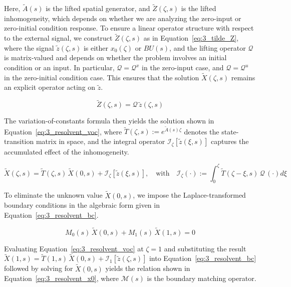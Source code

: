 Here, $\tilde{A}(s)$ is the lifted spatial generator, and $\tilde{Z}(\zeta, s)$ is the lifted inhomogeneity, which depends on whether we are analyzing the zero-input or zero-initial condition response. To ensure a linear operator structure with respect to the external signal, we construct $\tilde{Z}(\zeta, s)$ as in Equation~\eqref{eq:3_tilde_Z}, where the signal $\tilde{z}(\zeta, s)$ is either $x_0(\zeta)$ or $B U(s)$, and the lifting operator $\mathcal{Q}$ is matrix-valued and depends on whether the problem involves an initial condition or an input. In particular, $\mathcal{Q} = \mathcal{Q}^x$ in the zero-input case, and $\mathcal{Q} = \mathcal{Q}^u$ in the zero-initial condition case. This ensures that the solution $\tilde{X}(\zeta, s)$ remains an explicit operator acting on $\tilde{z}$.

\begin{equation} \label{eq:3_tilde_Z}
\tilde{Z}(\zeta, s) = \mathcal{Q}\, \tilde{z}(\zeta, s)
\end{equation}

The variation-of-constants formula then yields the solution shown in Equation~\eqref{eq:3_resolvent_voc}, where $\tilde{T}(\zeta, s) := e^{\tilde{A}(s) \zeta}$ denotes the state-transition matrix in space, and the integral operator $\mathcal{I}_\zeta[\tilde{z}(\xi, s)]$ captures the accumulated effect of the inhomogeneity.

\begin{equation} \label{eq:3_resolvent_voc}
    \tilde{X}(\zeta, s) = \tilde{T}(\zeta, s)\, \tilde{X}(0, s) + \mathcal{I}_\zeta[\tilde{z}(\xi, s)], \quad \text{with} \quad \mathcal{I}_\zeta(\cdot) := \int_0^\zeta \tilde{T}(\zeta - \xi, s)\, \mathcal{Q}\, (\cdot) d\xi
\end{equation}

To eliminate the unknown value $\tilde{X}(0, s)$, we impose the Laplace-transformed boundary conditions in the algebraic form given in Equation~\eqref{eq:3_resolvent_bc}.

\begin{equation} \label{eq:3_resolvent_bc}
    M_0(s)\, \tilde{X}(0, s) + M_1(s)\, \tilde{X}(1, s) = 0
\end{equation}

Evaluating Equation~\eqref{eq:3_resolvent_voc} at $\zeta = 1$ and substituting the result $\tilde{X}(1, s) = \tilde{T}(1, s)\, \tilde{X}(0, s) + \mathcal{I}_1[\tilde{z}(\zeta, s)]$ into Equation~\eqref{eq:3_resolvent_bc} followed by solving for $\tilde{X}(0, s)$ yields the relation shown in Equation~\eqref{eq:3_resolvent_x0}, where $\mathcal{M}(s)$ is the boundary matching operator.

